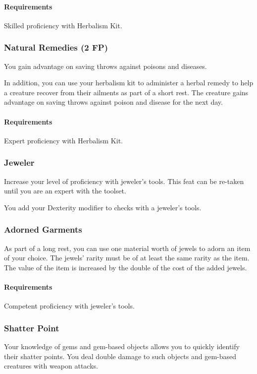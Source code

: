     \paragraph{Requirements} Skilled proficiency with Herbalism Kit.
\subsubsection{Natural Remedies (2 FP)} \label{feat::naturalremedies}
    You gain advantage on saving throws against poisons and diseases.

    In addition, you can use your herbalism kit to administer a herbal remedy to help a creature recover from their ailments as part of a short rest.
    The creature gains advantage on saving throws against poison and disease for the next day.
    \paragraph{Requirements} Expert proficiency with Herbalism Kit.

\subsubsection{Jeweler} \label{feat::jeweler}
    Increase your level of proficiency with jeweler's tools.
    This feat can be re-taken until you are an expert with the toolset.

    You add your Dexterity modifier to checks with a jeweler's tools.
\subsubsection{Adorned Garments} \label{feat::adornedgarments}
    As part of a long rest, you can use one material worth of jewels to adorn an item of your choice.
    The jewels' rarity must be of at least the same rarity as the item.
    The value of the item is increased by the double of the cost of the added jewels.
    \paragraph{Requirements} Competent proficiency with jeweler's tools.
\subsubsection{Shatter Point} \label{feat::shatterpoint}
    Your knowledge of gems and gem-based objects allows you to quickly identify their shatter points.
    You deal double damage to such objects and gem-based creatures with weapon attacks.
